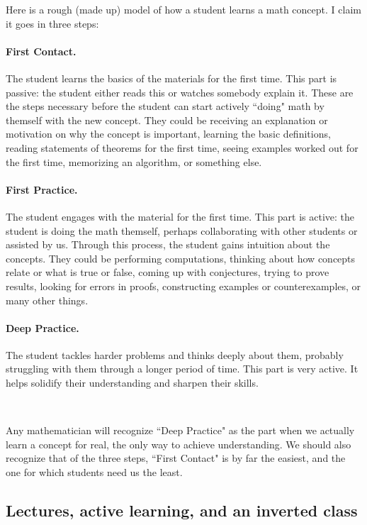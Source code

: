 \documentclass[11pt]{article}
\begin{document}
Here is a rough (made up) model of how a student learns a math concept.  I claim it goes in three steps:
	\paragraph{First Contact.}  The student learns the basics of the materials for the first time.  This part is passive: the student either reads this or watches somebody explain it.  These are the steps necessary before the student can start actively ``doing" math by themself with the new concept.  They could be receiving an explanation or motivation on why the concept is important, learning the basic definitions, reading statements of theorems for the first time, seeing examples worked out for the first time, memorizing an algorithm, or something else.  
	\paragraph{First Practice.}  The student engages with the material for the first time. This part is active: the student is doing the math themself, perhaps collaborating with other students or assisted by us.  Through this process, the student gains intuition about the concepts. They could be performing computations, thinking about how concepts relate or what is true or false, coming up with conjectures, trying to prove results, looking for errors in proofs, constructing examples or counterexamples, or many other things.
	\paragraph{Deep Practice.}  The student tackles harder problems and thinks deeply about them, probably struggling with them through a longer period of time.    This part is very active.  It helps solidify their understanding and sharpen their skills.

\

Any mathematician will recognize ``Deep Practice" as the part when we actually learn a concept for real, the only way to achieve understanding.  We should also recognize that of the three steps, ``First Contact" is by far the easiest, and the one for which students need us the least.


\subsection{Lectures, active learning, and an inverted class}
\end{document}
